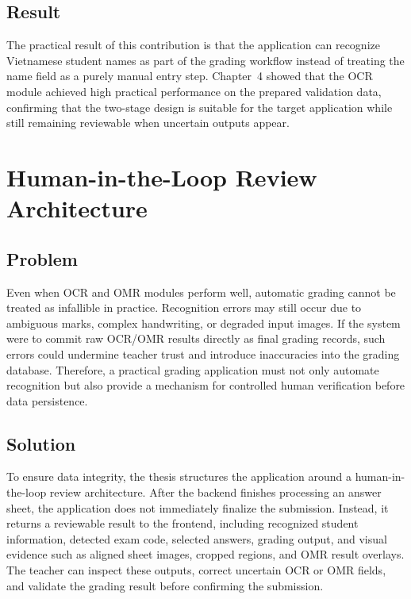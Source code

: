\documentclass[../Main.tex]{subfiles}
\begin{document}
\subsection{Result}
\label{subsection:5.2.3}

The practical result of this contribution is that the application can recognize
Vietnamese student names as part of the grading workflow instead of treating the
name field as a purely manual entry step. Chapter~4 showed that the OCR module
achieved high practical performance on the prepared validation data, confirming
that the two-stage design is suitable for the target application while still
remaining reviewable when uncertain outputs appear.

\section{Human-in-the-Loop Review Architecture}
\label{section:5.3}

\subsection{Problem}
\label{subsection:5.3.1}

Even when OCR and OMR modules perform well, automatic grading cannot be treated as infallible in practice. Recognition errors may still occur due to ambiguous marks, complex handwriting, or degraded input images. If the system were to commit raw OCR/OMR results directly as final grading records, such errors could undermine teacher trust and introduce inaccuracies into the grading database. Therefore, a practical grading application must not only automate recognition but also provide a mechanism for controlled human verification before data persistence.

\subsection{Solution}
\label{subsection:5.3.2}

To ensure data integrity, the thesis structures the application around a human-in-the-loop review architecture. After the backend finishes processing an answer sheet, the application does not immediately finalize the submission. Instead, it returns a reviewable result to the frontend, including recognized student information, detected exam code, selected answers, grading output, and visual evidence such as aligned sheet images, cropped regions, and OMR result overlays. The teacher can inspect these outputs, correct uncertain OCR or OMR fields, and validate the grading result before confirming the submission.
\end{document}
